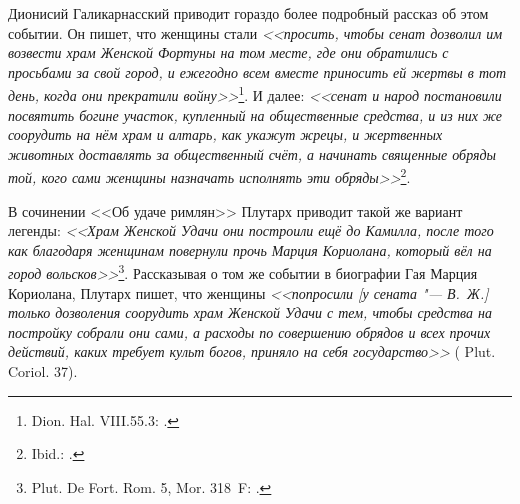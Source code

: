 Дионисий Галикарнасский приводит гораздо более подробный рассказ об этом событии. Он пишет, что женщины стали \textit{<<просить, чтобы сенат дозволил им возвести храм Женской Фортуны на том месте, где они обратились с просьбами за свой город, и ежегодно всем вместе приносить ей жертвы в тот день, когда они прекратили войну>>}\footnote{Dion. Hal. VIII.55.3: .}. И далее: \textit{<<сенат и народ постановили посвятить богине участок, купленный на общественные средства, и из них же соорудить на нём храм и алтарь, как укажут жрецы, и жертвенных животных доставлять за общественный счёт, а начинать священные обряды той, кого сами женщины назначать исполнять эти обряды>>}\footnote{Ibid.: .}.

В сочинении <<Об удаче римлян>> Плутарх приводит такой же вариант легенды: \textit{<<Храм Женской Удачи они построили ещё до Камилла, после того как благодаря женщинам повернули прочь Марция Кориолана, который вёл на город вольсков>>}\footnote{Plut. De Fort. Rom. 5, Mor. 318~F: .}.
Рассказывая о том же событии в биографии Гая Марция Кориолана, Плутарх пишет, что женщины \textit{<<попросили [у сената "--- В.~Ж.] только дозволения соорудить храм Женской Удачи с тем, чтобы средства на постройку собрали они сами, а расходы по совершению обрядов и всех прочих действий, каких требует культ богов, приняло на себя государство>>} (%
Plut. Coriol. 37). 

